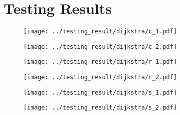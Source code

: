 \chapter{Testing Results}

\begin{figure}[H]
	\centering
	\texttt{[image: ../testing\_result/dijkstra/c\_1.pdf]}
\end{figure}

\begin{figure}[H]
	\centering
	\texttt{[image: ../testing\_result/dijkstra/c\_2.pdf]}
\end{figure}

\begin{figure}[H]
	\centering
	\texttt{[image: ../testing\_result/dijkstra/r\_1.pdf]}
\end{figure}

\begin{figure}[H]
	\centering
	\texttt{[image: ../testing\_result/dijkstra/r\_2.pdf]}
\end{figure}

\begin{figure}[H]
	\centering
	\texttt{[image: ../testing\_result/dijkstra/s\_1.pdf]}
\end{figure}

\begin{figure}[H]
	\centering
	\texttt{[image: ../testing\_result/dijkstra/s\_2.pdf]}
\end{figure}
